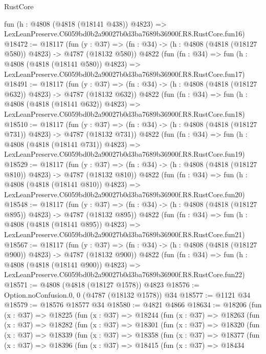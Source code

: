\begin{lexlean}{RustCore}
\begin{coremodule}
    fun (h : @4808 (@4818 (@18141 @438)) @4823) =>
    LexLeanPreserve.C6059bd0b2a90027b0d3ba7689b36900f.R8.RustCore.fun16)
@18472 := @18117
    (fun (y : @37) => (fn : @34) -> (h : @4808 (@4818 (@18127 @580)) @4823) -> @4787 (@18132 @580))
    @4822
    (fun (fn : @34) =>
    fun (h : @4808 (@4818 (@18141 @580)) @4823) =>
    LexLeanPreserve.C6059bd0b2a90027b0d3ba7689b36900f.R8.RustCore.fun17)
@18491 := @18117
    (fun (y : @37) => (fn : @34) -> (h : @4808 (@4818 (@18127 @632)) @4823) -> @4787 (@18132 @632))
    @4822
    (fun (fn : @34) =>
    fun (h : @4808 (@4818 (@18141 @632)) @4823) =>
    LexLeanPreserve.C6059bd0b2a90027b0d3ba7689b36900f.R8.RustCore.fun18)
@18510 := @18117
    (fun (y : @37) => (fn : @34) -> (h : @4808 (@4818 (@18127 @731)) @4823) -> @4787 (@18132 @731))
    @4822
    (fun (fn : @34) =>
    fun (h : @4808 (@4818 (@18141 @731)) @4823) =>
    LexLeanPreserve.C6059bd0b2a90027b0d3ba7689b36900f.R8.RustCore.fun19)
@18529 := @18117
    (fun (y : @37) => (fn : @34) -> (h : @4808 (@4818 (@18127 @810)) @4823) -> @4787 (@18132 @810))
    @4822
    (fun (fn : @34) =>
    fun (h : @4808 (@4818 (@18141 @810)) @4823) =>
    LexLeanPreserve.C6059bd0b2a90027b0d3ba7689b36900f.R8.RustCore.fun20)
@18548 := @18117
    (fun (y : @37) => (fn : @34) -> (h : @4808 (@4818 (@18127 @895)) @4823) -> @4787 (@18132 @895))
    @4822
    (fun (fn : @34) =>
    fun (h : @4808 (@4818 (@18141 @895)) @4823) =>
    LexLeanPreserve.C6059bd0b2a90027b0d3ba7689b36900f.R8.RustCore.fun21)
@18567 := @18117
    (fun (y : @37) => (fn : @34) -> (h : @4808 (@4818 (@18127 @900)) @4823) -> @4787 (@18132 @900))
    @4822
    (fun (fn : @34) =>
    fun (h : @4808 (@4818 (@18141 @900)) @4823) =>
    LexLeanPreserve.C6059bd0b2a90027b0d3ba7689b36900f.R8.RustCore.fun22)
@18571 := @4808 (@4818 (@18127 @1578)) @4823
@18576 := Option.noConfusion.{0, 0} (@4787 (@18132 @1578)) @34
@18577 := @1121 @34
@18579 := @18576 @18577 @34
@18580 := @4821 @4866
@18634 := @18206
    (fun (x : @37) =>
    @18225
      (fun (x : @37) =>
      @18244
        (fun (x : @37) =>
        @18263
          (fun (x : @37) =>
          @18282
            (fun (x : @37) =>
            @18301
              (fun (x : @37) =>
              @18320
                (fun (x : @37) =>
                @18339
                  (fun (x : @37) =>
                  @18358
                    (fun (x : @37) =>
                    @18377
                      (fun (x : @37) =>
                      @18396
                        (fun (x : @37) =>
                        @18415
                          (fun (x : @37) =>
                          @18434

\end{coremodule}
\end{lexlean}
